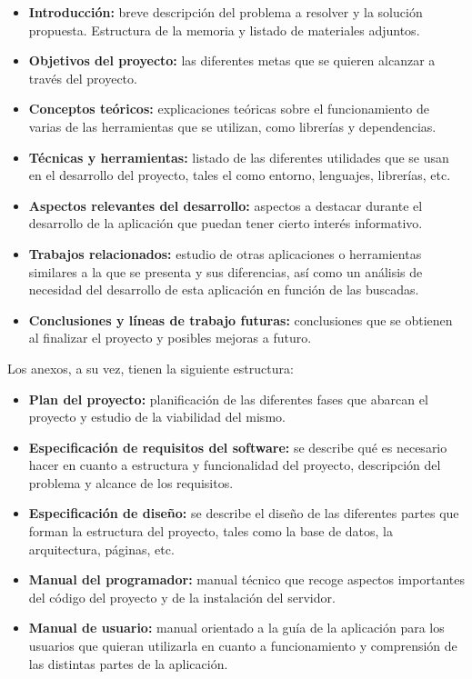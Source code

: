 \begin{itemize}
\item
  \textbf{Introducción:} breve descripción del problema a resolver y la
  solución propuesta. Estructura de la memoria y listado de materiales
  adjuntos.
\item
  \textbf{Objetivos del proyecto:} las diferentes metas que se quieren 
  alcanzar a través del proyecto.
\item
  \textbf{Conceptos teóricos:} explicaciones teóricas sobre el funcionamiento de varias
  de las herramientas que se utilizan, como librerías y dependencias.
\item
  \textbf{Técnicas y herramientas:} listado de las diferentes utilidades
  que se usan en el desarrollo del proyecto, tales el como entorno, lenguajes,
  librerías, etc.
\item
  \textbf{Aspectos relevantes del desarrollo:} aspectos a destacar durante el
  desarrollo de la aplicación que puedan tener cierto interés informativo.
\item
  \textbf{Trabajos relacionados:} estudio de otras aplicaciones o herramientas similares
  a la que se presenta y sus diferencias, así como un análisis de necesidad del desarrollo de
  esta aplicación en función de las buscadas.
\item
  \textbf{Conclusiones y líneas de trabajo futuras:} conclusiones que se obtienen
  al finalizar el proyecto y posibles mejoras a futuro.
\end{itemize}

Los anexos, a su vez, tienen la siguiente estructura:
\begin{itemize}
\item
  \textbf{Plan del proyecto:} planificación de las diferentes fases que abarcan 
  el proyecto y estudio de la viabilidad del mismo.
\item
  \textbf{Especificación de requisitos del software:} se describe qué es necesario
  hacer en cuanto a estructura y funcionalidad del proyecto, descripción del problema
  y alcance de los requisitos.
\item
  \textbf{Especificación de diseño:} se describe el diseño de las diferentes partes
  que forman la estructura del proyecto, tales como la base de datos, la arquitectura,
  páginas, etc.
\item
  \textbf{Manual del programador:} manual técnico que recoge aspectos importantes del 
  código del proyecto y de la instalación del servidor.
\item
  \textbf{Manual de usuario:} manual orientado a la guía de la aplicación para los
  usuarios que quieran utilizarla en cuanto a funcionamiento y comprensión de las distintas
  partes de la aplicación.
\end{itemize}

